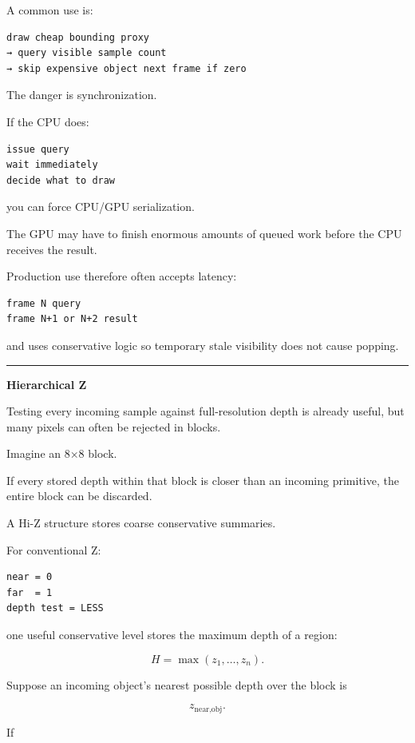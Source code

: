 A common use is:

\begin{verbatim}
draw cheap bounding proxy
→ query visible sample count
→ skip expensive object next frame if zero
\end{verbatim}

The danger is synchronization.

If the CPU does:

\begin{verbatim}
issue query
wait immediately
decide what to draw
\end{verbatim}

you can force CPU/GPU serialization.

The GPU may have to finish enormous amounts of queued work before the CPU receives the result.

Production use therefore often accepts latency:

\begin{verbatim}
frame N query
frame N+1 or N+2 result
\end{verbatim}

and uses conservative logic so temporary stale visibility does not cause popping.

\begin{center}\rule{0.5\linewidth}{0.5pt}\end{center}

\textbf{Hierarchical Z}

Testing every incoming sample against full-resolution depth is already useful, but many pixels can often be rejected in blocks.

Imagine an 8×8 block.

If every stored depth within that block is closer than an incoming primitive, the entire block can be discarded.

A Hi-Z structure stores coarse conservative summaries.

For conventional Z:

\begin{verbatim}
near = 0
far  = 1
depth test = LESS
\end{verbatim}

one useful conservative level stores the maximum depth of a region:

\[
H=\max(z_1,\dots,z_n).
\]

Suppose an incoming object's nearest possible depth over the block is

\[
z_{\text{near,obj}}.
\]

If

